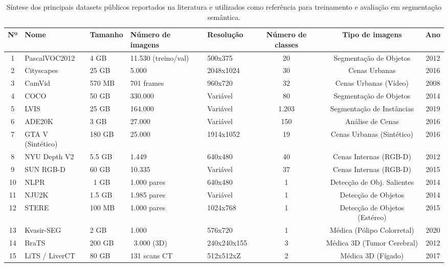 \begin{table}[h!]
\centering
\caption{Síntese dos principais datasets públicos reportados na literatura e utilizados como referência para treinamento e avaliação em segmentação semântica.}
\label{tab:datasets}
\tiny
\begin{adjustbox}{angle=90}
\begin{tabular}{|c|l|l|l|l|c|c|c|}
\hline
\textbf{Nº} & \textbf{Nome} & \textbf{Tamanho} & \textbf{Número de imagens} & \textbf{Resolução} & \textbf{Número de classes} & \textbf{Tipo de imagens} & \textbf{Ano} \\ \hline

1 & \ac{PascalVOC2012} & 4 GB & 11.530 (treino/val) & 500x375 & 20 & Segmentação de Objetos & 2012 \\ \hline
2 & Cityscapes & 25 GB & 5.000  & 2048x1024 & 30 & Cenas Urbanas & 2016 \\ \hline
3 & CamVid & 570 MB & 701 frames & 960x720 & 32 & Cenas Urbanas (Vídeo) & 2008 \\ \hline
4 & COCO & 50 GB & 330.000 & Variável & 80 & Segmentação de Objetos & 2014 \\ \hline
5 & LVIS & 25 GB & 164.000 & Variável & 1.203 & Segmentação de Instâncias & 2019 \\ \hline
6 & ADE20K & 3 GB & 27.000 & Variável & 150 & Análise de Cenas & 2016 \\ \hline
7 & GTA V (Sintético) & 180 GB & 25.000 & 1914x1052 & 19 & Cenas Urbanas (Sintético) & 2016 \\ \hline
8 & NYU Depth V2 & 5.5 GB & 1.449 & 640x480 & 40 & Cenas Internas (RGB-D) & 2012 \\ \hline
9 & SUN RGB-D & 60 GB & 10.335 & Variável & 37 & Cenas Internas (RGB-D) & 2015 \\ \hline
10 & NLPR & ~1 GB & 1.000 pares & 640x480 & 1 & Detecção de Obj. Salientes & 2014 \\ \hline
11 & NJU2K & 1.5 GB & 1.985 pares & Variável & 1 & Detecção de Objetos & 2014 \\ \hline
12 & STERE & 100 MB & 1.000 pares & 1024x768 & 1 & Detecção de Objetos (Estéreo) & 2015 \\ \hline
13 & Kvasir-SEG & 2 GB & 1.000 & 576x720 & 1 & Médica (Pólipo Colorretal) & 2020 \\ \hline
14 & BraTS & 200 GB & ~3.000 (3D) & 240x240x155 & 3 & Médica 3D (Tumor Cerebral) & 2012 \\ \hline
15 & LiTS / LiverCT & 80 GB & 131 scans CT & 512x512xZ & 2 & Médica 3D (Fígado) & 2017 \\ \hline

\end{tabular}
\end{adjustbox}
\end{table}
